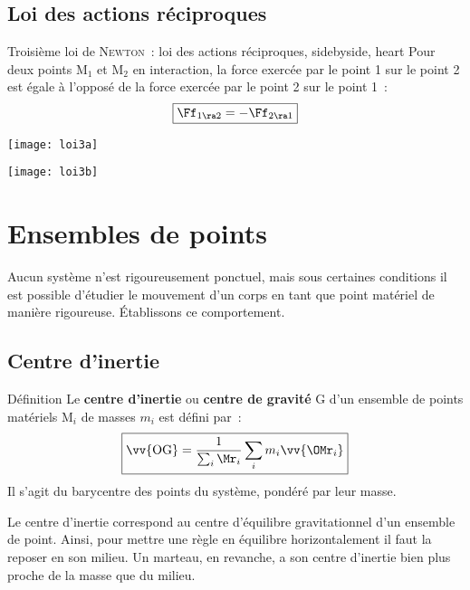 \documentclass[../main/main.tex]{subfiles}
\begin{document}
\subsection{Loi des actions réciproques}

\begin{tprop}{Troisième loi de \textsc{Newton}~: loi des actions réciproques,
    sidebyside, heart}
    Pour deux points M$_1$ et M$_2$ en interaction, la force exercée par le
    point 1 sur le point 2 est égale à l'opposé de la force exercée par le point
    2 sur le point 1~:
    \[\boxed{\Ff_{1\ra2} = - \Ff_{2\ra1}}\]
    \tcblower
    \begin{minipage}{0.45\linewidth}
        \begin{center}
            \texttt{[image: loi3a]}
        \end{center}
    \end{minipage}
    \hfill
    \begin{minipage}{0.45\linewidth}
        \begin{center}
            \texttt{[image: loi3b]}
        \end{center}
    \end{minipage}
\end{tprop}

\section{Ensembles de points}
Aucun système n'est rigoureusement ponctuel, mais sous certaines conditions il
est possible d'étudier le mouvement d'un corps en tant que point matériel de
manière rigoureuse. Établissons ce comportement.

\subsection{Centre d'inertie}

\begin{tdefi}{Définition}
    Le \textbf{centre d'inertie} ou \textbf{centre de gravité} G d'un ensemble
    de points matériels M$_i$ de masses $m_i$ est défini par~:
    \[\boxed{\vv{\rm OG} = \frac{1}{\sum_i \Mr_i} \sum_i m_i \vv{{\OMr}_i}}\]
    Il s'agit du barycentre des points du système, pondéré par leur masse.
\end{tdefi}

Le centre d'inertie correspond au centre d'équilibre gravitationnel d'un
ensemble de point. Ainsi, pour mettre une règle en équilibre horizontalement il
faut la reposer en son milieu. Un marteau, en revanche, a son centre d'inertie
bien plus proche de la masse que du milieu.
\end{document}
